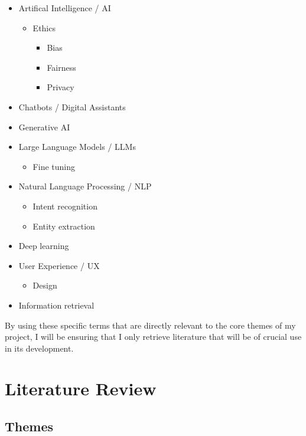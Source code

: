 \documentclass[12pt]{report}
\begin{document}
    \begin{itemize}
        \item Artifical Intelligence / AI 
        \begin{itemize}
            \item Ethics
            \begin{itemize}
                \item Bias
                \item Fairness
                \item Privacy
            \end{itemize}
        \end{itemize}
        \item Chatbots / Digital Assistants
        \item Generative AI
        \item Large Language Models / LLMs
        \begin{itemize}
            \item Fine tuning
        \end{itemize}
        \item Natural Language Processing / NLP
        \begin{itemize}
            \item Intent recognition
            \item Entity extraction
        \end{itemize}
        \item Deep learning
        \item User Experience / UX
        \begin{itemize}
            \item Design
        \end{itemize}
        \item Information retrieval
    \end{itemize}

    \noindent
    By using these specific terms that are directly relevant to the core themes of my project,
    I will be ensuring that I only retrieve literature that will be of crucial use in its 
    development.


    \chapter{Literature Review}

    \section{Themes}
\end{document}
